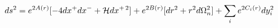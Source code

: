 \begin{equation}
ds^2=e^{2A(r)}[-4dx^+dx^-+{\cal H}dx^{+\,2}]+e^{2B(r)}[dr^2+r^2d\Omega_n^2]
+\sum_i e^{2C_i(r)}dy_i^2
\label{eq:pmetans}
\end{equation}

